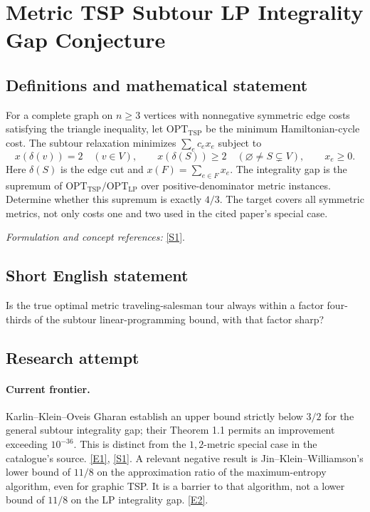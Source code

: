 \documentclass[11pt,a4paper]{article}
\newcommand{\sref}[2]{\hyperlink{source:#1:#2}{[S#2]}}
\newcommand{\eref}[2]{\hyperlink{extra:#1:#2}{[E#2]}}
\newif\ifshowcatalogue
\newcommand{\cataloguescope}[1]{\ifshowcatalogue
 \paragraph{Exact scope in the supplied catalogue.}
 \begin{quote}\small #1\end{quote}\fi}
\numberwithin{equation}{section}
\begin{document}
\setcounter{section}{198}
\clearpage
\section{\texorpdfstring{Metric TSP Subtour LP Integrality Gap Conjecture}{Metric TSP Subtour LP Integrality Gap Conjecture}}\label{199}
\subsection{Definitions and mathematical statement}
For a complete graph on $n\ge3$ vertices with nonnegative symmetric edge costs satisfying the triangle inequality, let $\mathrm{OPT}_{\mathrm{TSP}}$ be the minimum Hamiltonian-cycle cost. The subtour relaxation minimizes $\sum_e c_ex_e$ subject to
\[
 x(\delta(v))=2\quad(v\in V),\qquad
 x(\delta(S))\ge2\quad(\varnothing\ne S\subsetneq V),\qquad x_e\ge0.
\]
Here $\delta(S)$ is the edge cut and $x(F)=\sum_{e\in F}x_e$. The integrality gap is the supremum of
$\mathrm{OPT}_{\mathrm{TSP}}/\mathrm{OPT}_{\mathrm{LP}}$ over positive-denominator metric instances. Determine whether this supremum is exactly $4/3$. The target covers all symmetric metrics, not only costs one and two used in the cited paper's special case.
\par\smallskip\textit{Formulation and concept references:} \sref{199}{1}.
\cataloguescope{Prove or disprove that the integrality gap of the subtour (Held-Karp) LP relaxation of the symmetric metric traveling salesman problem equals 4/3.}
\subsection{Short English statement}
Is the true optimal metric traveling-salesman tour always within a factor four-thirds of the subtour linear-programming bound, with that factor sharp?
\subsection{Research attempt}

\paragraph{Current frontier.}
Karlin--Klein--Oveis Gharan establish an upper bound strictly below
$3/2$ for the general subtour integrality gap; their Theorem 1.1 permits
an improvement exceeding $10^{-36}$. This is distinct from the
$1,2$-metric special case in the catalogue's source. \eref{199}{1},
\sref{199}{1}.
A relevant negative result is Jin--Klein--Williamson's lower bound of
$11/8$ on the approximation ratio of the maximum-entropy algorithm,
even for graphic TSP. It is a barrier to that algorithm, not a lower
bound of $11/8$ on the LP integrality gap. \eref{199}{2}.
\end{document}
